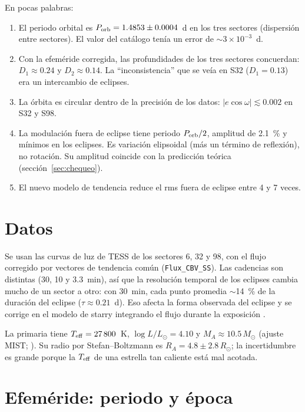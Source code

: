 \documentclass[11pt,a4paper]{article}
\newcommand{\porb}{P_{\rm orb}}
\newcommand{\Rsun}{R_\odot}
\newcommand{\Msun}{M_\odot}
\newcommand{\teff}{T_{\rm eff}}
\begin{document}
En pocas palabras:
\begin{enumerate}
\item El periodo orbital es $\porb=1.4853\pm0.0004$~d en los tres sectores (dispersión entre
  sectores). El valor del catálogo tenía un error de $\sim3\times10^{-3}$~d.
\item Con la efeméride corregida, las profundidades de los tres sectores concuerdan:
  $D_1\approx0.24$ y $D_2\approx0.14$. La ``inconsistencia'' que se veía en S32
  ($D_1=0.13$) era un intercambio de eclipses.
\item La órbita es circular dentro de la precisión de los datos:
  $|e\cos\omega|\lesssim0.002$ en S32 y S98.
\item La modulación fuera de eclipse tiene periodo $\porb/2$, amplitud de 2.1~\% y mínimos
  en los eclipses. Es variación elipsoidal (más un término de reflexión), no rotación. Su
  amplitud coincide con la predicción teórica (sección~\ref{sec:chequeo}).
\item El nuevo modelo de tendencia reduce el rms fuera de eclipse entre 4 y 7 veces.
\end{enumerate}

\section{Datos}
Se usan las curvas de luz de TESS \citep{Ricker2015} de los sectores 6, 32 y 98, con el flujo
corregido por vectores de tendencia común (\texttt{Flux\_CBV\_SS}). Las cadencias son distintas
(30, 10 y 3.3~min), así que la resolución temporal de los eclipses cambia mucho de un sector a
otro: con 30~min, cada punto promedia $\sim$14~\% de la duración del eclipse
($\tau\approx0.21$~d). Eso afecta la forma observada del eclipse y se corrige en el modelo de
starry integrando el flujo durante la exposición \citep{Kipping2010}.

La primaria tiene $\teff=27\,800$~K, $\log L/L_\odot=4.10$ y $M_A\approx10.5\,\Msun$ (ajuste
MIST; \citealt{Choi2016,Dotter2016}). Su radio por Stefan--Boltzmann es
$R_A=4.8\pm2.8\,\Rsun$; la incertidumbre es grande porque la $\teff$ de una estrella tan
caliente está mal acotada.

\section{Efeméride: periodo y época}
\label{sec:efemeride}
\end{document}
